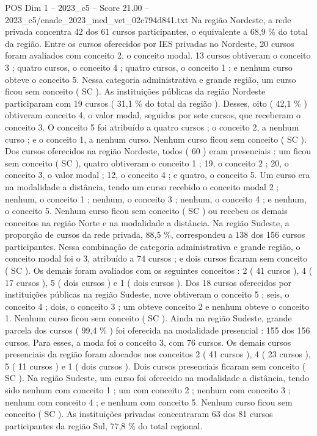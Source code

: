 \begin{textsample}{POS Dim 1 – 2023\_c5 – Score 21.00 – 2023\_c5/enade\_2023\_med\_vet\_02c794d841.txt}
Na região Nordeste, a rede privada concentra 42 dos 61 cursos participantes, o equivalente a 68,9 \% do total da região.
Entre os cursos oferecidos por IES privadas no Nordeste, 20 cursos foram avaliados com conceito 2, o conceito modal. 13 cursos obtiveram o conceito 3 ; quatro cursos, o conceito 4 ; quatro cursos, o conceito 1 ; e nenhum curso obteve o conceito 5.
Nessa categoria administrativa e grande região, um curso ficou sem conceito ( SC ).
As instituições públicas da região Nordeste participaram com 19 cursos ( 31,1 \% do total da região ).
Desses, oito ( 42,1 \% ) obtiveram conceito 4, o valor modal, seguidos por sete cursos, que receberam o conceito 3.
O conceito 5 foi atribuído a quatro cursos ; o conceito 2, a nenhum curso ; e o conceito 1, a nenhum curso.
Nenhum curso ficou sem conceito ( SC ).
Dos cursos oferecidos na região Nordeste, todos ( 60 ) eram presenciais : um ficou sem conceito ( SC ), quatro obtiveram o conceito 1 ; 19, o conceito 2 ; 20, o conceito 3, o valor modal ; 12, o conceito 4 ; e quatro, o conceito 5.
Um curso era na modalidade a distância, tendo um curso recebido o conceito modal 2 ; nenhum, o conceito 1 ; nenhum, o conceito 3 ; nenhum, o conceito 4 ; e nenhum, o conceito 5.
Nenhum curso ficou sem conceito ( SC ) ou recebeu os demais conceitos na região Norte e na modalidade a distância.
Na região Sudeste, a proporção de cursos da rede privada, 88,5 \%, correspondeu a 138 dos 156 cursos participantes.
Nessa combinação de categoria administrativa e grande região, o conceito modal foi o 3, atribuído a 74 cursos ; e dois cursos ficaram sem conceito ( SC ).
Os demais foram avaliados com os seguintes conceitos : 2 ( 41 cursos ), 4 ( 17 cursos ), 5 ( dois cursos ) e 1 ( dois cursos ).
Dos 18 cursos oferecidos por instituições públicas na região Sudeste, nove obtiveram o conceito 5 ; seis, o conceito 4 ; dois, o conceito 3 ; um obteve conceito 2 e nenhum obteve o conceito 1.
Nenhum curso ficou sem conceito ( SC ).
Ainda na região Sudeste, grande parcela dos cursos ( 99,4 \% ) foi oferecida na modalidade presencial : 155 dos 156 cursos.
Para esses, a moda foi o conceito 3, com 76 cursos.
Os demais cursos presenciais da região foram alocados nos conceitos 2 ( 41 cursos ), 4 ( 23 cursos ), 5 ( 11 cursos ) e 1 ( dois cursos ).
Dois cursos presenciais ficaram sem conceito ( SC ).
Na região Sudeste, um curso foi oferecido na modalidade a distância, tendo sido nenhum com conceito 1 ; um com conceito 2 ; nenhum com conceito 3 ; nenhum com conceito 4 ; e nenhum com conceito 5.
Nenhum curso ficou sem conceito ( SC ).
As instituições privadas concentraram 63 dos 81 cursos participantes da região Sul, 77,8 \% do total regional.

\end{textsample}
